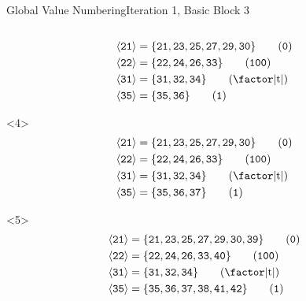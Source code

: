 \documentclass{beamer}
\newcommand{\vn}[1]{\ensuremath{\langle\texttt{#1}\rangle}}
\newcommand{\vreg}[1]{\texttt{#1}}
\begin{document}
\begin{frame}[fragile]{Global Value Numbering}{Iteration 1, Basic Block 3}
\begin{columns}[t,onlytextwidth]
\begin{column}{.5\textwidth}
\begin{onlyenv}
\begin{align*}
          \vn{21} &= \{\vreg{21},
                       \vreg{23},
                       \vreg{25},
                       \vreg{27},
                       \vreg{29},
                       \vreg{30}\} \tag{\texttt{0}} \\
          \vn{22} &= \{\vreg{22},
                       \vreg{24},
                       \vreg{26},
                       \vreg{33}\} \tag{\texttt{100}} \\
          \vn{31} &= \{\vreg{31},
                       \vreg{32},
                       \vreg{34}\} \tag{\text{\factor|t|}} \\
          \vn{35} &= \{\vreg{35},
                       \vreg{36}\} \tag{\texttt{1}}
        \end{align*}
      \end{onlyenv}
      \begin{onlyenv}<4>
        \begin{align*}
          \vn{21} &= \{\vreg{21},
                       \vreg{23},
                       \vreg{25},
                       \vreg{27},
                       \vreg{29},
                       \vreg{30}\} \tag{\texttt{0}} \\
          \vn{22} &= \{\vreg{22},
                       \vreg{24},
                       \vreg{26},
                       \vreg{33}\} \tag{\texttt{100}} \\
          \vn{31} &= \{\vreg{31},
                       \vreg{32},
                       \vreg{34}\} \tag{\text{\factor|t|}} \\
          \vn{35} &= \{\vreg{35},
                       \vreg{36},
                       \vreg{37}\} \tag{\texttt{1}}
        \end{align*}
      \end{onlyenv}
      \begin{onlyenv}<5>
        \begin{align*}
          \vn{21} &= \{\vreg{21},
                       \vreg{23},
                       \vreg{25},
                       \vreg{27},
                       \vreg{29},
                       \vreg{30},
                       \vreg{39}\} \tag{\texttt{0}} \\
          \vn{22} &= \{\vreg{22},
                       \vreg{24},
                       \vreg{26},
                       \vreg{33},
                       \vreg{40}\} \tag{\texttt{100}} \\
          \vn{31} &= \{\vreg{31},
                       \vreg{32},
                       \vreg{34}\} \tag{\text{\factor|t|}} \\
          \vn{35} &= \{\vreg{35},
                       \vreg{36},
                       \vreg{37},
                       \vreg{38},
                       \vreg{41},
                       \vreg{42}\} \tag{\texttt{1}}
        \end{align*}
      \end{onlyenv}
    \end{column}
  \end{columns}
\end{frame}
\end{document}

